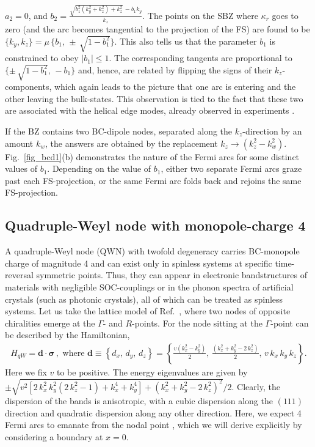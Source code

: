 \documentclass[aps,prb,onecolumn, footinbib, 10pt]{revtex4-2}
\begin{document}
$a_2 = 0 $, and $b_2  =  \frac{\sqrt{b_1^2 \left(k_y^2+k_z^2\right)+k_z^2}\,-b_1 k_y}{k_z}$. The points on the SBZ where $\kappa_r$ goes to zero (and the arc becomes tangential to the projection of the FS) are found to be $\lbrace k_y, k_z \rbrace = \mu \,\lbrace b_1 , \, \pm\, \sqrt{1-b_1^2}\rbrace $. This also tells us that the parameter $b_1$ is constrained to obey $|b_1|\leq 1 $. 
The corresponding tangents are proportional to $ \lbrace \pm\,\sqrt{1-b_1^2} , \, -b_1\rbrace $ and, hence, are related by flipping the signs of their $k_z$-components, which again leads to the picture that one arc is entering and the other leaving the bulk-states. 
This observation is tied to the fact that these two are associated with the helical edge modes, already observed in experiments \cite{dipole-helical-arc}.

If the BZ contains two BC-dipole nodes, separated along the $ k_z$-direction by an amount $k_w$, the answers are obtained by the replacement $ k_z \rightarrow (k_z^2 - k_w^2)$. 
Fig.~\ref{fig_bcd1}(b) demonstrates the nature of the Fermi arcs for some distinct values of $b_1$. Depending on the value of $b_1$, either two separate Fermi arcs graze past each FS-projection, or the same Fermi arc folds back and rejoins the same FS-projection. 


\subsection{Quadruple-Weyl node with monopole-charge 4}


 
A quadruple-Weyl node (QWN) with twofold degeneracy carries BC-monopole charge of magnitude 4 \cite{charge4-1, charge4-2, charge4-3, charge4-4} and can exist only in spinless systems at specific time-reversal symmetric points. Thus, they can appear in electronic bandstructures of materials with
negligible SOC-couplings or in the phonon spectra of artificial crystals (such as photonic crystals), all of which can be treated as spinless systems. Let us take the lattice model of Ref.~\cite{charge4-4}, where two nodes of opposite chiralities emerge at the $\Gamma$- and $R$-points. 
For the node sitting at the $\Gamma$-point can be described by the Hamiltonian,
\begin{align}
\label{eqhamqw}
H_{qW} = \boldsymbol{d} \cdot \boldsymbol{\sigma}  \,, \text{ where }
\boldsymbol{d} \equiv \left\{ d_x,\, d_y, \, d_z \right\}= \left\{\frac{ v \left(k_x^2-k_y^2\right)}{2}, \,\frac{\left(k_x^2+k_y^2-2 \,k_z^2\right)}{2} ,
\,v\, k_x\, k_y\, k_z\right\} .
\end{align}
Here we fix $v$ to be positive. The energy eigenvalues are given by $\pm \sqrt{ v^2 \left [
2 \,k_x^2 \,k_y^2 \left(2 \,k_z^2-1\right)+k_x^4+k_y^4\right ]
+\left(k_x^2+k_y^2-2\, k_z^2\right)^2 } / 2$. Clearly, the dispersion of the bands is anisotropic, with a cubic dispersion along the $(111)$ direction and quadratic dispersion along any other direction. Here, we expect 4 Fermi arcs to emanate from the nodal point \cite{quad-weyl-arc}, which we will derive explicitly by considering a boundary at $x = 0$.
\end{document}
